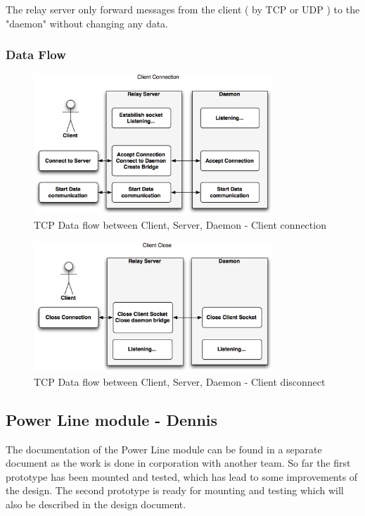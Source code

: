The relay server only forward messages from the client ( by TCP or UDP ) to the "daemon" without changing any data.

\subsubsection{Data Flow}

\begin{figure}[H]
	\begin{centering}
		 \includegraphics[width=0.8\textwidth,page=2,angle=0]{images/dataflow1.png}
		\caption{TCP Data flow between Client, Server, Daemon - Client connection}
	\end{centering}
\end{figure}

\begin{figure}[H]
	\begin{centering}
		 \includegraphics[width=0.8\textwidth,page=2,angle=0]{images/dataflow2.png}
		\caption{TCP Data flow between Client, Server, Daemon - Client disconnect}
	\end{centering}
\end{figure}


\subsection{Power Line module - Dennis}
The documentation of the Power Line module can be found in a separate document  as the work is done in corporation with another team. So far the first prototype has been mounted and tested, which has lead to some improvements of the design. The second prototype is ready for mounting and testing which will also be described in the design document. 

